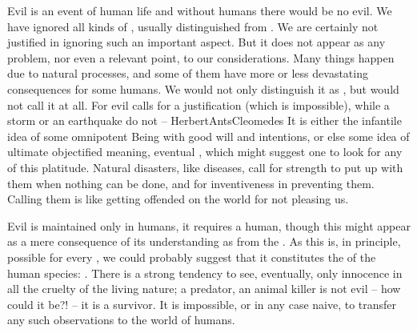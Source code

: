 Evil is an event of human life and without humans there would be no evil. We
have ignored all kinds of , usually distinguished from
.  We are certainly not justified in ignoring such an important
aspect. But it does not appear as any problem, nor even a relevant point, to our
considerations. Many things happen due to natural processes, and some of them
have more or less devastating consequences for some humans. We would not only
distinguish it as , but would not call it  at all.
For evil calls for a justification (which is impossible), while a storm or an
earthquake do not -- \citet{catastrophes are innocent.}{HerbertAnts}{Cleomedes}
It is either the infantile idea of some omnipotent Being with good will and
 intentions, or else some idea of ultimate {objectified} meaning,
eventual , which might suggest one to look for any 
of this platitude.  Natural disasters, like diseases, call for strength to put
up with them when nothing can be done, and for inventiveness in preventing them.
Calling them  is like getting offended on the world for not pleasing
us.

Evil is maintained only in humans, it requires a human, though this might appear
as a mere consequence of its understanding as  from the
.  As this is, in principle, possible for every , we
could probably suggest that it constitutes the  of the
human species: .  There is a strong tendency to see,
eventually, only innocence in all the cruelty of the living nature; a predator,
an animal killer is not evil -- how could it be?! -- it is a survivor. It is
impossible, or in any case naive, to transfer any such observations to the world
of humans.


